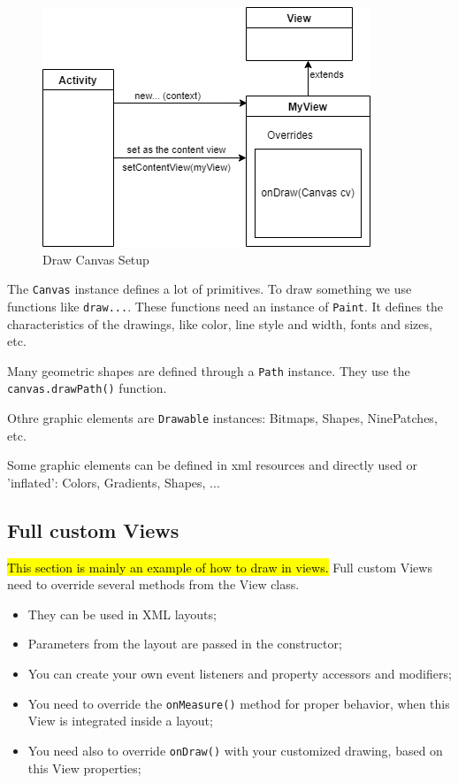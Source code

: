 \begin{figure}[h]
\centering
\includegraphics[width=0.7\linewidth]{figures/08_draw_canvas.png}
\caption{Draw Canvas Setup}
\label{fig:draw_canvas}
\end{figure}


The \texttt{Canvas} instance defines a lot of primitives. 
To draw something we use functions like \texttt{draw...}. 
These functions need an instance of \texttt{Paint}. It defines
the characteristics of the drawings, like color, line style and 
width, fonts and sizes, etc. 

Many geometric shapes are defined through a \texttt{Path} instance.
They use the \texttt{canvas.drawPath()} function.

Othre graphic elements are \texttt{Drawable} instances: Bitmaps, 
Shapes, NinePatches, etc. 

Some graphic elements can be defined in xml resources and 
directly used or 'inflated': Colors, Gradients, Shapes, ...


\subsection{Full custom Views}
\hl{This section is mainly an example of how to draw in views.}
Full custom Views need to override several methods from the View
class. 

\begin{itemize}
    \item They can be used in XML layouts;
    \item Parameters from the layout are passed in the
    constructor;
    \item You can create your own event listeners and property
    accessors and modifiers; 
    \item You need to override the \texttt{onMeasure()} method for
    proper behavior, when this View is integrated inside a
    layout; 
    \item You need also to override \texttt{onDraw()} with your
    customized drawing, based on this View properties; 
\end{itemize}

